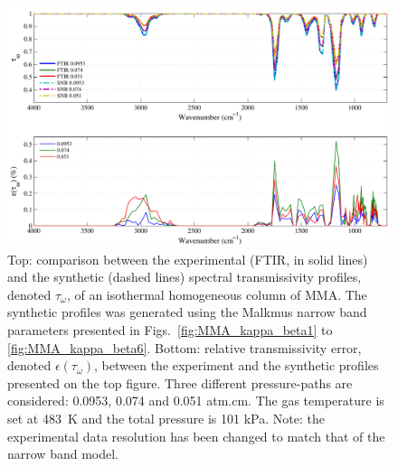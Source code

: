 \begin{figure}[p]
\includegraphics[width=\textwidth]{Figures/Comparison_Fit_MMA_MALKMUS_Temp483K.pdf}
\caption{Top: comparison between the experimental (FTIR, in solid lines) and the synthetic (dashed lines) spectral transmissivity profiles, denoted $\tau_{\omega}$, of an isothermal homogeneous column of MMA. The synthetic profiles was generated using the Malkmus narrow band parameters presented in Figs.~\ref{fig:MMA_kappa_beta1} to \ref{fig:MMA_kappa_beta6}. Bottom: relative transmissivity error, denoted $\epsilon{(\tau_{\omega})}$, between the experiment and the synthetic profiles presented on the top figure. Three different pressure-paths are considered: 0.0953, 0.074 and 0.051 atm.cm. The gas temperature is set at 483~K and the total pressure is 101 kPa. Note: the experimental data resolution has been changed to match that of the narrow band model. \label{fig:MMA_SNBVerify_483K}}
\end{figure}

